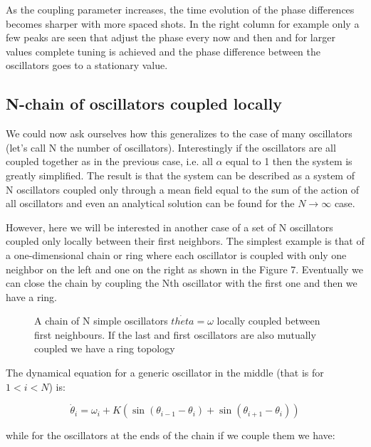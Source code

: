 \documentclass{article}
\begin{document}
As the coupling parameter increases, the time evolution of the phase differences becomes sharper with more spaced shots. 
In the right column for example only a few peaks are seen that adjust the phase every now and then and for larger values complete tuning is achieved and the phase difference between the oscillators goes to a stationary value.

\newpage

\subsection{N-chain of oscillators coupled locally}

We could now ask ourselves how this generalizes to the case of many oscillators (let's call N the number of oscillators). 
Interestingly if the oscillators are all coupled together as in the previous case, i.e. all $\alpha$ equal to 1 then the system is greatly simplified. 
The result is that the system can be described as a system of N oscillators coupled only through a mean field equal to the sum of the action of all oscillators and even an analytical solution can be found for the $N \rightarrow \infty$ case.

However,  here we will be interested in another case of a set of N oscillators coupled only locally between their first neighbors. 
The simplest example is that of a one-dimensional chain or ring where each oscillator is coupled with only one neighbor on the left and one on the right as shown in the Figure 7. 
Eventually we can close the chain by coupling the Nth oscillator with the first one and then we have a ring. 

\begin{figure} [h]
    \centerline{}
    \caption{A chain of N simple oscillators $\dot{theta}=\omega$ locally coupled between first neighbours. If the last and first oscillators are also mutually coupled we have a ring topology}
    \label{fig_threecoupled}
\end{figure}

The dynamical equation for a generic oscillator in the middle (that is for $1<i<N$) is:

\begin{equation} \label{eq_Ncoupled}
    \dot{\theta}_i = \omega_i + K \left(\sin(\theta_{i-1} - \theta_i)+\sin(\theta_{i+1} - \theta_i)\right)  
\end{equation}

while for the oscillators at the ends of the chain if we couple
them we have:
\end{document}
